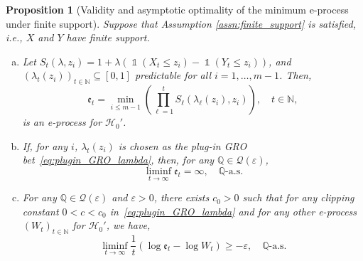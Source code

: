 \documentclass[12pt,twoside]{article}
\theoremstyle{plain}
\newtheorem{proposition}{Proposition}
\theoremstyle{definition}
\theoremstyle{remark}
\newcommand{\inparen}[1]{\left(#1\right)}
\DeclareMathOperator*{\indsymb}{\mathds{1}}
\newcommand{\indicator}[1]{\indsymb\inparen{#1}}
\newcommand{\N}{\mathbb{N}}
\newcommand{\calH}{\mathcal{H}}
\newcommand{\calQ}{\mathcal{Q}}
\newcommand{\Qsymb}{\mathbb{Q}}
\newcommand{\e}{\mathfrak{e}}
\renewcommand{\epsilon}{\varepsilon}
\begin{document}
\begin{proposition}
[Validity and asymptotic optimality of the minimum e-process under finite support]
\label{ppn:min_approach}
Suppose that Assumption \ref{assn:finite_support} is satisfied, i.e., $X$ and $Y$ have finite support. 
\begin{enumerate}[(a)]
    \item Let $S_t(\lambda,z_i)=1+\lambda(\indicator{X_t\leq z_i}-\indicator{Y_t\leq z_i})$, and
    $(\lambda_t(z_i))_{t\in \N} \subseteq [0,1]$ predictable for all $i=1,\ldots, m-1$. Then, 
    \begin{equation}\label{eq:min_e_process}
        \e_t = \min_{i\leq m-1} \left(\prod_{\ell=1}^t S_\ell(\lambda_\ell(z_i),z_i)\right), \quad t\in \N, 
    \end{equation}
    is an e-process for $\calH_0'$. \label{item:min_eprocess}
    \item If, for any $i$, $\lambda_{t}(z_i)$ is chosen as the plug-in GRO bet~\eqref{eq:plugin_GRO_lambda}, then, for any $\Qsymb \in \calQ(\varepsilon)$,\label{item:min_eprocess_has_power_one}
    \begin{equation*}\label{eq:asymptotic_power_one_for_min_approach}
        \liminf_{t\to \infty} \e_t = \infty, \quad \text{$\Qsymb$-a.s.}
    \end{equation*}
    \item 
    For any $\Qsymb\in \calQ(\varepsilon)$ and $\epsilon>0$, there exists $c_0>0$ such that for any clipping constant $0<c<c_0$ in~\eqref{eq:plugin_GRO_lambda} and for any other e-process $(W_t)_{t\in \N}$ for $\calH_0'$, we have, \label{item:min_eprocess_is_asymptotically_log-optimal}
    \begin{equation*}
        \liminf_{t\to \infty} \frac{1}{t}\left(\log{\e_t}-\log{W_t}\right) \geq -\epsilon, \quad \Qsymb\textrm{-a.s.}
    \end{equation*}
\end{enumerate}
\end{proposition}
\end{document}
